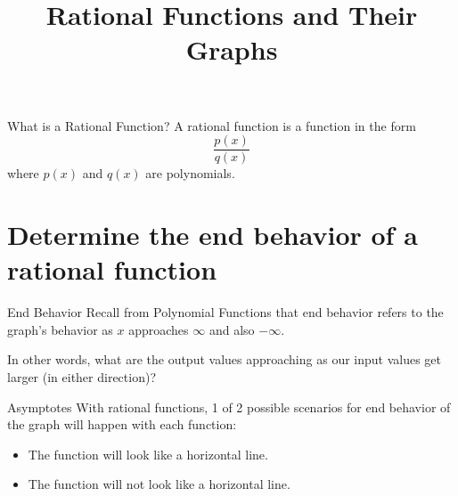 \documentclass[t,usenames,dvipsnames]{beamer}
\title{Rational Functions and Their Graphs}
\author{}
\date{}
\begin{document}
\begin{frame}
    \maketitle
\end{frame}

\begin{frame}{What is a Rational Function?}
    A \alert{rational function} is a function in the form
    \[ \frac{p(x)}{q(x)} \]
    where $p(x)$ and $q(x)$ are polynomials.
\end{frame}

\section{Determine the end behavior of a rational function}

\begin{frame}{End Behavior}
Recall from Polynomial Functions that \alert{end behavior} refers to the graph's behavior as $x$ approaches $\infty$ and also $-\infty$. \newline\\  \pause

In other words, what are the output values approaching as our input values get larger (in either direction)? 
\end{frame}

\begin{frame}{Asymptotes}
With rational functions, 1 of 2 possible scenarios for end behavior of the graph will happen with each function:    \newline\\  \pause
\begin{itemize}
    \item The function will look like a horizontal line.    \newline\\   \pause
    \item The function will not look like a horizontal line.   \newline\\ 
\end{itemize}
\end{frame}
\end{document}
